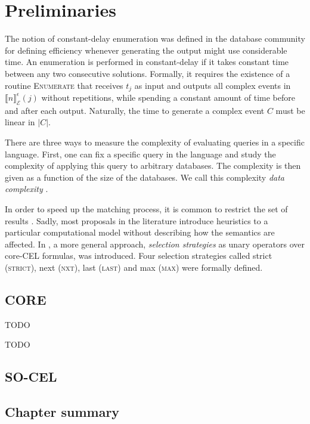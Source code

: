 \chapter{Preliminaries}\label{chapter:preliminaries}

The notion of constant-delay enumeration was defined in the database community \cite{constant-delay-1 , constant-delay-2} for defining efficiency whenever generating the output might use considerable time. An enumeration is performed in constant-delay if it takes constant time between any two consecutive solutions. Formally, it requires the existence of a routine \textsc{Enumerate} that receives $t_{j}$ as input and outputs all complex events in $\llbracket n \rrbracket^{\epsilon}_{\mathcal{E}}(j)$ without repetitions, while spending a constant amount of time before and after each output. Naturally, the time to generate a complex event $C$ must be linear in $|C|$.

There are three ways to measure the complexity of evaluating queries in a specific language. First, one can fix a specific query in the language and study the complexity of applying this query to arbitrary databases. The complexity is then given as a function of the size of the databases. We call this complexity \textit{data complexity} \cite{data-complexity}.


In order to speed up the matching process, it is common to restrict the set of results \cite{10.1016/j.scico.2010.06.010, 10.1145/1142473.1142520, Zhang2014OnCA}. Sadly, most proposals in the literature introduce heuristics to a particular computational model without describing how the semantics are affected. In \cite{formal-framework-cer}, a more general approach, \textit{selection strategies} as unary operators over core-CEL formulas, was introduced. Four selection strategies called strict (\textsc{strict}), next (\textsc{nxt}), last (\textsc{last}) and max (\textsc{max}) were formally defined.


\section{CORE}

\begin{definition}[Match]
  \label{def:match}
  TODO
\end{definition}

\begin{definition}
  \label{def:maximalmatch}
  TODO
\end{definition}

\section{SO-CEL}



\section{Chapter summary}

